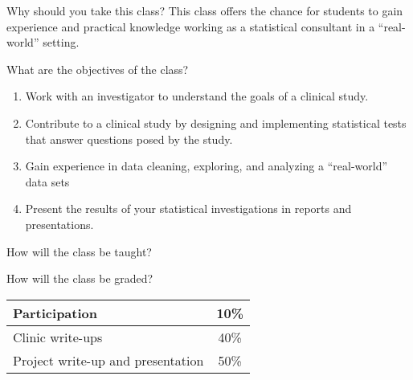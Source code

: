 \documentclass[14pt]{beamer}
\begin{document}
\begin{frame}{Why should you take this class?}
This class offers the chance for students to gain experience and practical 
knowledge working as a statistical consultant in a ``real-world'' setting. 
\end{frame}

\begin{frame}{What are the objectives of the class?}
\begin{enumerate}
\item Work with an investigator to understand the goals of a clinical study.
\item Contribute to a clinical study by designing and implementing statistical 
  tests that answer questions posed by the study.
\item Gain experience in data cleaning, exploring, and analyzing a 
  ``real-world'' data sets
\item Present the results of your statistical investigations in reports 
  and presentations.
\end{enumerate}
\end{frame}

\begin{frame}{How will the class be taught?}
\begin{itemize}
\end{itemize}
\end{frame}

\begin{frame}{How will the class be graded?}
\begin{tabular}{|l|c|}\hline 
Participation & 10\% \\ \hline
Clinic write-ups & 40\% \\ \hline
Project write-up and presentation & 50\% \\ \hline
\end{tabular}
\end{frame}
\end{document}
